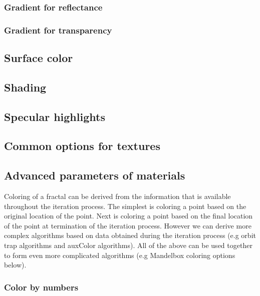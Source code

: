 \subsubsection{Gradient for reflectance}\label{materials-reflectance-gradient}

\subsubsection{Gradient for transparency}\label{materials-transparency-gradient}

\subsection{Surface color}\label{materials-surface_color}

\subsection{Shading}\label{materials-shading}

\subsection{Specular highlights}\label{materials-specular}

\subsection{Common options for textures}\label{materials-textures}

\subsection{Advanced parameters of materials}\label{materials-advanced}

Coloring of a fractal can be derived from the information that is available throughout the iteration process.
The simplest is coloring a point based on the original location of the point.
Next is coloring a point based on the final location of the point at termination of the iteration process.
However we can derive more complex algorithms based on data obtained during the iteration process (e.g orbit trap algorithms and auxColor algorithms).
All of the above can be used together to form even more complicated algorithms (e.g Mandelbox coloring options below).

\subsubsection{Color by numbers}\label{materials-color by numbers}

